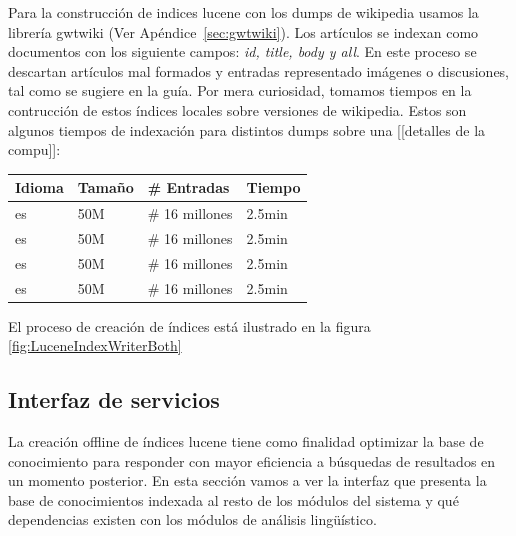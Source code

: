 
Para la construcción de indices lucene con los dumps de wikipedia usamos la librería gwtwiki (Ver Apéndice~\ref{sec:gwtwiki}).
Los artículos se indexan como documentos con los siguiente campos: \emph{id, title, body y all}. En este proceso se descartan artículos mal formados y 
entradas representado imágenes o discusiones, tal como se sugiere en la guía. 
Por mera curiosidad, tomamos tiempos en la contrucción de estos índices locales sobre versiones de wikipedia.
Estos son algunos tiempos de indexación para distintos dumps sobre una [[detalles de la compu]]:
\begin{center}
\begin{tabular}{| l | l | l | l |}
\hline
Idioma & Tamaño & \# Entradas & Tiempo \\ \hline
es & 50M & \# 16 millones & 2.5min \\ \hline
es & 50M & \# 16 millones & 2.5min \\ \hline
es & 50M & \# 16 millones & 2.5min \\ \hline
es & 50M & \# 16 millones & 2.5min \\ \hline
\end{tabular}
\end{center}

El proceso de creación de índices está ilustrado en la figura \ref{fig:LuceneIndexWriterBoth}






\subsection{Interfaz de servicios}

La creación offline de índices lucene tiene como finalidad optimizar
la base de conocimiento para responder con mayor eficiencia 
a búsquedas de resultados en un momento posterior. 
En esta sección vamos a ver la interfaz que presenta la base de conocimientos indexada 
al resto de los módulos del sistema y qué dependencias existen con los módulos de
análisis lingüístico.

